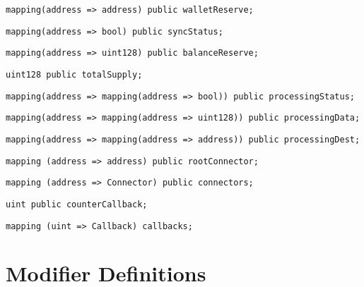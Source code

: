 \begin{lstlisting}[firstnumber=27]
  mapping(address => address) public walletReserve;
\end{lstlisting}

\begin{lstlisting}[firstnumber=28]
  mapping(address => bool) public syncStatus;
\end{lstlisting}

\begin{lstlisting}[firstnumber=29]
  mapping(address => uint128) public balanceReserve;
\end{lstlisting}

\begin{lstlisting}[firstnumber=31]
  uint128 public totalSupply;
\end{lstlisting}

\begin{lstlisting}[firstnumber=33]
  mapping(address => mapping(address => bool)) public processingStatus;
\end{lstlisting}

\begin{lstlisting}[firstnumber=34]
  mapping(address => mapping(address => uint128)) public processingData;
\end{lstlisting}

\begin{lstlisting}[firstnumber=35]
  mapping(address => mapping(address => address)) public processingDest;
\end{lstlisting}

\begin{lstlisting}[firstnumber=43]
  mapping (address => address) public rootConnector;
\end{lstlisting}

\begin{lstlisting}[firstnumber=44]
  mapping (address => Connector) public connectors;
\end{lstlisting}

\begin{lstlisting}[firstnumber=46]
  uint public counterCallback;
\end{lstlisting}

\begin{lstlisting}[firstnumber=62]
  mapping (uint => Callback) callbacks;
\end{lstlisting}

\section{Modifier Definitions}


